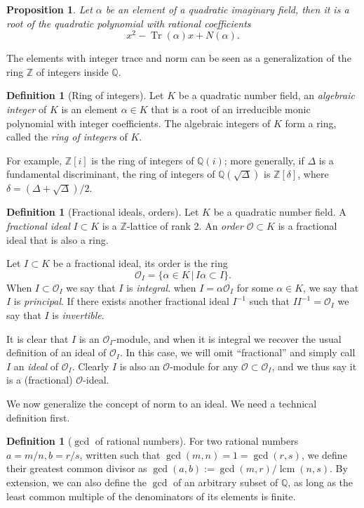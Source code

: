 \documentclass[10pt]{article}
\theoremstyle{plain}
\newtheorem{proposition}[theorem]{Proposition}
\theoremstyle{definition}
\newtheorem{definition}[theorem]{Definition}
\DeclareMathOperator{\Tr}{Tr} %
\DeclareMathOperator{\lcm}{lcm} %
\def\Q{\ensuremath{\mathbb{Q}}}
\def\O{\ensuremath{\mathcal{O}}}
\begin{document}
\begin{proposition}
  Let $α$ be an element of a quadratic imaginary field, then it is a
  root of the quadratic polynomial with rational coefficients
  \[x^2 - \Tr(α)x + N(α).\]
\end{proposition}

The elements with integer trace and norm can be seen as a
generalization of the ring $ℤ$ of integers inside $ℚ$.

\begin{definition}[Ring of integers]
  Let $K$ be a quadratic number field,
  an \emph{algebraic integer} of $K$ is an
  element $α∈K$ that is a root of an irreducible monic polynomial with
  integer coefficients. %
  The algebraic integers of $K$ form a ring, called the \emph{ring of
    integers} of $K$.
\end{definition}

For example, $ℤ[i]$ is the ring of integers of $ℚ(i)$; more generally,
if $Δ$ is a fundamental discriminant, the ring of integers of
$ℚ(\sqrt{Δ})$ is $ℤ[δ]$, where $δ=(Δ+\sqrt{Δ})/2$. %

\begin{definition}[Fractional ideals, orders]
  Let $K$ be a quadratic number field. %
  A \emph{fractional ideal} $I ⊂ K$ is a $ℤ$-lattice of rank 2. %
  An \emph{order} $\O ⊂ K$ is a fractional ideal that is also a ring.

  Let $I ⊂ K$ be a fractional ideal, its order is the ring
  \[\O_I = \{ α ∈ K \,|\, Iα ⊂ I \}.\]
  When $I ⊂ \O_I$ we say that $I$ is \emph{integral}. %
  when $I = α\O_I$ for some $α∈K$, we say that $I$ is
  \emph{principal}. %
  If there exists another fractional ideal $I^{-1}$ such that
  $II^{-1} = \O_I$ we say that $I$ is \emph{invertible}.
\end{definition}  

It is clear that $I$ is an $\O_I$-module, and when it is integral we
recover the usual definition of an ideal of $\O_I$. %
In this case, we will omit ``fractional'' and simply call $I$ an
\emph{ideal} of $\O_I$. %
Clearly $I$ is also an $\O$-module for any $\O⊂\O_I$, and we thus say
it is a (fractional) $\O$-ideal. %

We now generalize the concept of norm to an ideal. %
We need a technical definition first.

\begin{definition}[$\gcd$ of rational numbers]
  For two rational numbers $a=m/n,b=r/s$, written such that
  $\gcd(m,n)=1=\gcd(r,s)$, we define their greatest common divisor as
  $\gcd(a,b) := \gcd(m,r)/\lcm(n,s)$.  By extension, we can also
  define the $\gcd$ of an arbitrary subset of $\Q$, as long as the
  least common multiple of the denominators of its elements is finite.
\end{definition}
\end{document}
